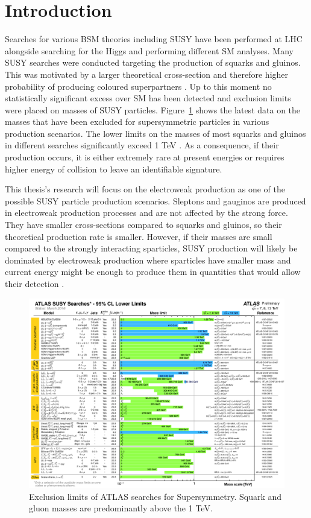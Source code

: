 \section{Introduction}

Searches for various BSM theories including SUSY have been performed at LHC  alongside searching for the Higgs and performing different SM analyses. Many SUSY searches were conducted targeting the production of squarks and gluinos. This was motivated by a larger theoretical cross-section and therefore higher probability of producing coloured superpartners \cite{borschensky2014squark}. Up to this moment no statistically significant excess over SM has been detected and exclusion limits were placed on masses of SUSY particles. Figure~\ref{fig:SUSYlimit} shows the latest data on the masses that have been excluded for supersymmetric particles in various production scenarios. The lower limits on the masses of most squarks and gluinos in different searches significantly exceed 1 TeV \citep{aad2015summary}. As a consequence, if their production occurs, it is either extremely rare at present energies or requires higher energy of collision to leave an identifiable signature. 

This thesis's research will focus on the electroweak production as one of the possible SUSY particle production scenarios. Sleptons and gauginos are produced in electroweak production processes and are not affected by the strong force. They have smaller cross-sections compared to squarks and gluinos, so their theoretical production rate is smaller. However, if their masses are small compared to the strongly interacting sparticles, SUSY production will likely be dominated by electroweak production where sparticles have smaller mass and current energy might be enough to produce them in quantities that would allow their detection \citep{atlas2015search}. 
\begin{figure}[!ht]
\includegraphics[width=\textwidth]{Chap3/ATLAS_SUSY_Summary.png}
\caption[Exclusion limits of ATLAS searches for Supersymmetry]{Exclusion limits of ATLAS searches for Supersymmetry. Squark and gluon masses are predominantly above the 1 TeV. \citep{SUSYlimits}}
\label{fig:SUSYlimit}
\end{figure}
\cleardoublepage


